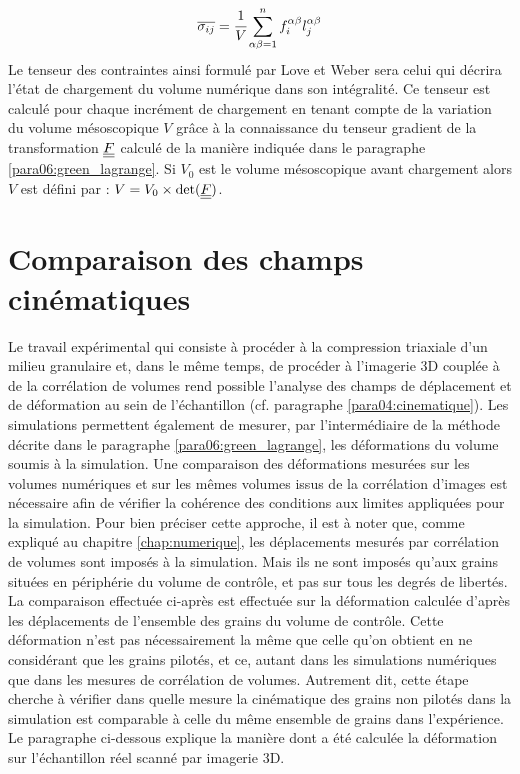 		\begin{equation}\label{eq06:love_weber}
			\overline{\sigma_{ij}}
			= \cfrac{1}{V} \sum_{\alpha\beta=1}^{n} f_i^{\alpha\beta} l_j^{\alpha\beta}
		\end{equation}
		Le tenseur des contraintes ainsi formulé par Love et Weber sera celui qui décrira l'état de chargement du volume numérique dans son intégralité. Ce tenseur est calculé pour chaque incrément de chargement en tenant compte de la variation du volume mésoscopique $V$ grâce à la connaissance du tenseur gradient de la transformation $\underline{\underline{F}}$ calculé de la manière indiquée dans le paragraphe \ref{para06:green_lagrange}. Si $V_0$ est le volume mésoscopique avant chargement alors $V$ est défini par : $V = V_0 \times \mathrm{det}(\underline{\underline{F}})$.
		
\section{Comparaison des champs cinématiques}\label{para06:comparaison_defo}
	Le travail expérimental qui consiste à procéder à la compression triaxiale d'un milieu granulaire et, dans le même temps, de procéder à l'imagerie 3D couplée à de la corrélation de volumes rend possible l'analyse des champs de déplacement et de déformation au sein de l'échantillon (cf. paragraphe \ref{para04:cinematique}). Les simulations permettent également de mesurer, par l'intermédiaire de la méthode décrite dans le paragraphe \ref{para06:green_lagrange}, les déformations du volume soumis à la simulation. Une comparaison des déformations mesurées sur les volumes numériques et sur les mêmes volumes issus de la corrélation d'images est nécessaire afin de vérifier la cohérence des conditions aux limites appliquées pour la simulation. Pour bien préciser cette approche, il est à noter que, comme expliqué au chapitre \ref{chap:numerique}, les déplacements mesurés par corrélation de volumes sont imposés à la simulation. Mais ils ne sont imposés qu'aux grains situées en périphérie du volume de contrôle, et pas sur tous les degrés de libertés. La comparaison effectuée ci-après est effectuée sur la déformation calculée d'après les déplacements de l'ensemble des grains du volume de contrôle. Cette déformation n'est pas nécessairement la même que celle qu'on obtient en ne considérant que les grains pilotés, et ce, autant dans les simulations numériques que dans les mesures de corrélation de volumes. Autrement dit, cette étape cherche à vérifier dans quelle mesure la cinématique des grains non pilotés dans la simulation est comparable à celle du même ensemble de grains dans l'expérience. Le paragraphe ci-dessous explique la manière dont a été calculée la déformation sur l’échantillon réel scanné par imagerie 3D.
